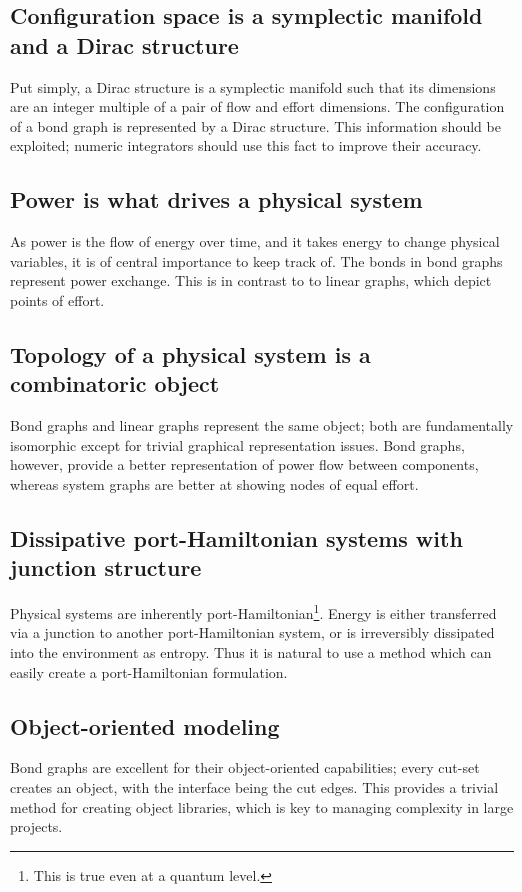 \documentclass[utf8,a4paper,12pt]{report}
\begin{document}
\subsection{Configuration space is a symplectic manifold and a Dirac structure}
Put simply, a Dirac structure is a symplectic manifold such that its dimensions are an integer multiple of a pair of flow and effort dimensions. The configuration of a bond graph is represented by a Dirac structure. This information should be exploited; numeric integrators should use this fact to improve their accuracy. 
\subsection{Power is what drives a physical system}
As power is the flow of energy over time, and it takes energy to change physical variables, it is of central importance to keep track of. The bonds in bond graphs represent power exchange. This is in contrast to to linear graphs, which depict points of effort.
\subsection{Topology of a physical system is a combinatoric object}
Bond graphs and linear graphs represent the same object; both are fundamentally isomorphic except for trivial graphical representation issues. Bond graphs, however, provide a better representation of power flow between components, whereas system graphs are better at showing nodes of equal effort.
\subsection{Dissipative port-Hamiltonian systems with junction structure}
Physical systems are inherently port-Hamiltonian\footnote{This is true even at a quantum level.}. Energy is either transferred via a junction to another port-Hamiltonian system, or is irreversibly dissipated into the environment as entropy. Thus it is natural to use a method which can easily create a port-Hamiltonian formulation.
\subsection{Object-oriented modeling}
Bond graphs are excellent for their object-oriented capabilities; every cut-set creates an object, with the interface being the cut edges. This provides a trivial method for creating object libraries, which is key to managing complexity in large projects.
\end{document}
